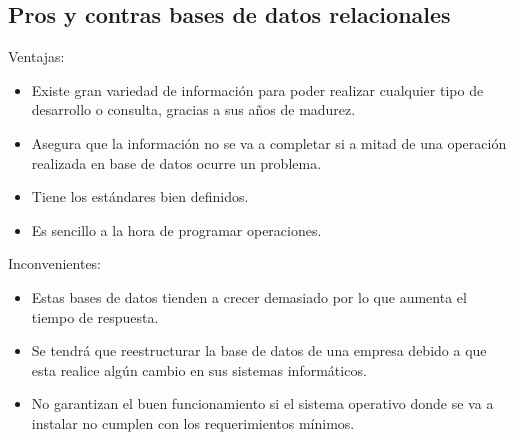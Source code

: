 \documentclass[12pt]{report} %
\begin{document}
	\subsection{Pros y contras bases de datos relacionales}
	Ventajas:
	 \begin{itemize}
		\item Existe gran variedad de información para poder realizar cualquier tipo de desarrollo o consulta, gracias a sus años de madurez.
		\item Asegura que la información no se va a completar si a mitad de una operación realizada en base de datos ocurre un problema.
		\item Tiene los estándares bien definidos.
		\item Es sencillo a la hora de programar operaciones.
	\end{itemize}
	Inconvenientes:
		 \begin{itemize}
		\item Estas bases de datos tienden a crecer demasiado por lo que aumenta el tiempo de respuesta.
		\item	Se tendrá que reestructurar la base de datos de una empresa debido a que esta realice algún cambio en sus sistemas informáticos.
		\item 	No garantizan el buen funcionamiento si el sistema operativo donde se va a instalar no cumplen con los requerimientos mínimos.
	\end{itemize}
\end{document}

